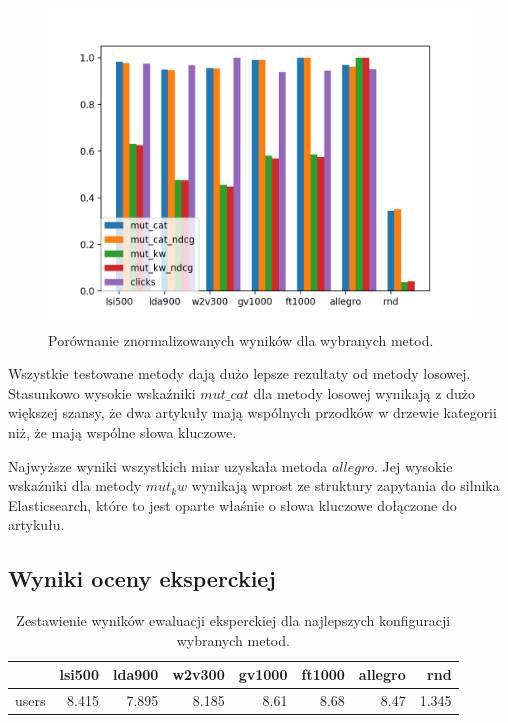 \documentclass[pl]{minipw} %
\begin{document}
\begin{figure}[H]
	\centering
	\includegraphics[width=1\textwidth]{img/results/lsi500_lda900_w2v300_gv1000_ft1000_allegro_rnd_.png}
	\caption{Porównanie znormalizowanych wyników dla wybranych metod.}
\end{figure}

Wszystkie testowane metody dają dużo lepsze rezultaty od metody losowej. Stasunkowo wysokie wskaźniki $mut\_cat$ dla metody losowej wynikają z dużo większej szansy, że dwa artykuły mają wspólnych przodków w drzewie kategorii niż, że mają wspólne słowa kluczowe.

Najwyższe wyniki wszystkich miar uzyskała metoda $allegro$. Jej wysokie wskaźniki dla metody $mut_kw$ wynikają wprost ze struktury zapytania do silnika Elasticsearch, które to jest oparte właśnie o słowa kluczowe dołączone do artykułu.

\subsection{Wyniki oceny eksperckiej}

\begin{table}[H]
	\centering
	\begin{tabular}{lrrrrrrr}
		\hline
		&   lsi500 &   lda900 &   w2v300 &   gv1000 &   ft1000 &   allegro &   rnd \\
		\hline
		users &    8.415 &    7.895 &    8.185 &     8.61 &     8.68 &      8.47 & 1.345 \\
		\hline
	\end{tabular}
	\caption{Zestawienie wyników ewaluacji eksperckiej dla najlepszych konfiguracji wybranych metod.}
\end{table}
\end{document}
